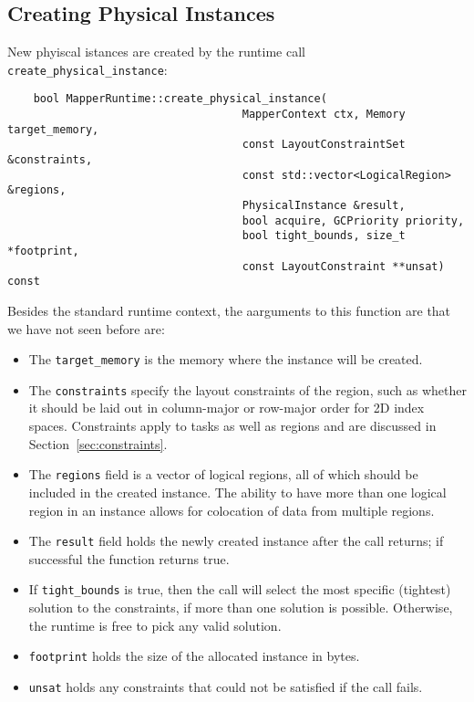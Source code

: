 \subsection{Creating Physical Instances}
\label{subsec:mapping:instances}

New phyiscal istances are created by the runtime call {\tt create\_physical\_instance}:
\begin{lstlisting}
    bool MapperRuntime::create_physical_instance(
                                    MapperContext ctx, Memory target_memory,
                                    const LayoutConstraintSet &constraints, 
                                    const std::vector<LogicalRegion> &regions,
                                    PhysicalInstance &result, 
                                    bool acquire, GCPriority priority,
                                    bool tight_bounds, size_t *footprint,
                                    const LayoutConstraint **unsat) const
\end{lstlisting}
Besides the standard runtime context, the aarguments to this function are that we have not seen before are:
\begin{itemize}
\item The {\tt target\_memory} is the memory where the instance will be created.
  \item  The {\tt constraints} specify the layout constraints of the region, such as whether it should be laid out in column-major or row-major order for 2D index spaces.  Constraints apply to tasks as well as regions and are discussed in Section~\ref{sec:constraints}.
\item The {\tt regions} field is a vector of logical regions, all of which should be included in the created instance.  The ability to have more than one logical region in an instance allows for colocation of data from multiple regions.
\item The {\tt result} field holds the newly created instance after the call returns; if successful the function returns true.
\item If {\tt tight\_bounds} is true, then the call will select the most specific (tightest) solution to the constraints, if more than one solution is possible.  Otherwise, the runtime is free to pick any valid solution.
\item {\tt footprint} holds the size of the allocated instance in bytes.
\item {\tt unsat} holds any constraints that could not be satisfied if the call fails.
\end{itemize}

